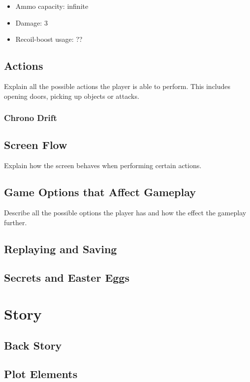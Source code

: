 \documentclass[12pt]{article}
\begin{document}
\begin{itemize}
	\item Ammo capacity: infinite
	\item Damage: 3
	\item Recoil-boost usage: ??
\end{itemize}

\subsection{Actions}

Explain all the possible actions the player is able to perform. This includes opening doors, picking up objects or attacks.

\subsubsection{Chrono Drift}

\subsection{Screen Flow}

Explain how the screen behaves when performing certain actions.

\subsection{Game Options that Affect Gameplay}

Describe all the possible options the player has and how the effect the gameplay further. 

\subsection{Replaying and Saving}

\subsection{Secrets and Easter Eggs}

\section{Story}

\subsection{Back Story}

\subsection{Plot Elements}
\end{document}
